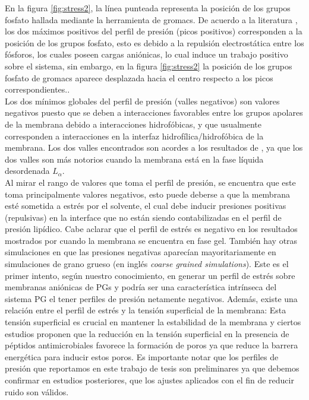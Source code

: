 En la figura \ref{fig:stress2}, la l\'{i}nea punteada representa la posici\'{o}n de los grupos fosfato hallada mediante la herramienta de gromacs. De acuerdo a la literatura \cite{Vanegas2011CrystallineErgosterol}, los dos m\'{a}ximos positivos del perfil de presi\'{o}n (picos positivos) corresponden a la posici\'{o}n de los grupos fosfato, esto es debido a la repulsi\'{o}n electrost\'{a}tica entre los f\'{o}sforos, los cuales poseen cargas ani\'{o}nicas, lo cual induce un trabajo positivo sobre el sistema, sin embargo, en la figura \ref{fig:stress2} la posici\'{o}n de los grupos fosfato de gromacs aparece desplazada hacia el centro respecto a los picos correspondientes..\\

Los dos m\'{i}nimos globales del perfil de presi\'{o}n (valles negativos) son valores negativos puesto que se deben a interacciones favorables entre los grupos apolares de la membrana debido a interacciones hidrof\'{o}bicas, \cite{Vanegas2011CrystallineErgosterol} y que usualmente corresponden a interacciones en la interfaz hidrof\'{i}lica/hidrof\'{o}bica de la membrana. Los dos valles encontrados son acordes a los resultados de \cite{Vanegas2011CrystallineErgosterol}, ya que los dos valles son m\'{a}s notorios cuando la membrana est\'{a} en la fase l\'{i}quida desordenada $L_{\alpha}$.\\

Al mirar el rango de valores que toma el perfil de presi\'{o}n, se encuentra que este toma principalmente valores negativos, esto puede deberse a que la membrana est\'{e} sometida a estr\'{e}s por el solvente, el cual debe inducir presiones positivas (repulsivas) en la interface que no est\'{a}n siendo contabilizadas en el perfil de presi\'{o}n lip\'{i}dico. Cabe aclarar que el perfil de estr\'{e}s es negativo en los resultados mostrados por \cite{Vanegas2011CrystallineErgosterol} cuando la membrana se encuentra en fase gel. Tambi\'{e}n hay otras simulaciones \cite{Vanegas2014ImportanceSimulations} en que las presiones negativas aparec\'{i}an mayoritariamente en simulaciones de grano grueso (en ingl\'{e}s \textit{coarse grained simulations}). Este es el primer intento, seg\'{u}n nuestro conocimiento, en generar un perfil de estr\'{e}s sobre membranas ani\'{o}nicas de PGs y podr\'{i}a ser una caracter\'{i}stica intr\'{i}nseca del sistema PG el tener perfiles de presi\'{o}n netamente negativos. Adem\'{a}s, existe una relaci\'{o}n entre el perfil de estr\'{e}s y la tensi\'{o}n superficial de la membrana: Esta tensi\'{o}n superficial es crucial en mantener la estabilidad de la membrana y ciertos estudios \cite{Losasso2019ModulationBilayers} proponen que la reducci\'{o}n en la tensi\'{o}n superficial en la presencia de p\'{e}ptidos antimicrobiales favorece la formaci\'{o}n de poros ya que reduce la barrera energ\'{e}tica para inducir estos poros. Es importante notar que los perfiles de presi\'{o}n que reportamos en este trabajo de tesis son preliminares ya que debemos confirmar en estudios posteriores, que los ajustes aplicados con el fin de reducir ruido son v\'{a}lidos.\\


